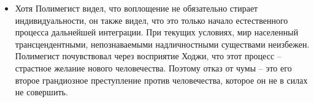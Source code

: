 \documentclass[12pt,a4paper]{article}
\newenvironment{meta}{
\begin{tcolorbox}[breakable, colback=lightgray, colframe=gray]
}{
\end{tcolorbox}
}
\begin{document}
\begin{meta}
\begin{itemize}
	\item Хотя Полимегист видел, что воплощение не обязательно стирает индивидуальности, он также видел, что это только начало естественного процесса дальнейшей интеграции. При текущих условиях, мир населенный трансцендентными, непознаваемыми надличностными существами неизбежен. Полимегист почувствовал через восприятие Ходжи, что этот процесс -- страстное желание нового человечества. Поэтому отказ от чумы -- это его второе грандиозное преступление против человечества, которое он не в силах не совершить.
	
\end{itemize}
\end{meta}
\end{document}
